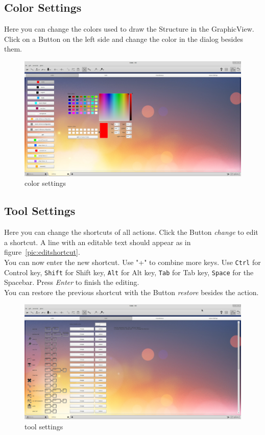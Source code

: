 \documentclass[a4paper,11pt]{report}
\begin{document}
\subsection{Color Settings}
Here you can change the colors used to draw the Structure in the GraphicView. Click on a Button on the left side and change the color in the dialog besides them.
\begin{figure}[H]
\includegraphics[width=\textwidth]{../pictures/settings_colors.png}
\caption{color settings}
\label{pic:colorsettings}
\end{figure}






\subsection{Tool Settings}
Here you can change the shortcuts of all actions. Click the Button \textit{change} to edit a shortcut. A line with an editable text should appear as in figure~\ref{pic:editshortcut}.\\
You can now enter the new shortcut. Use "+" to combine more keys. Use \texttt{Ctrl} for Control key, \texttt{Shift} for Shift key, \texttt{Alt} for Alt key, \texttt{Tab} for Tab key, \texttt{Space} for the Spacebar. Press \textit{Enter} to finish the editing.\\
You can restore the previous shortcut with the Button \textit{restore} besides the action. 



\begin{figure}[H]
\includegraphics[width=\textwidth]{../pictures/settings_shortcuts.png}
\caption{tool settings}
\label{pic:shortcutsettings}
\end{figure}
\end{document}

